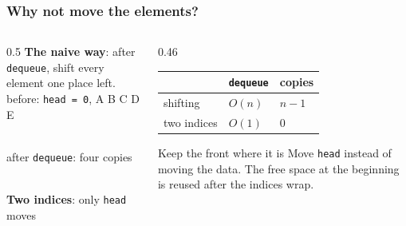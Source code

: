 \documentclass[aspectratio=169,10pt,compress]{beamer}
\begin{document}
\begin{frame}[t,fragile] \frametitle{Why not move the elements?}
  \begin{columns}[T]
    \begin{column}{0.5\textwidth}
      \small \textbf{The naive way}: after \texttt{dequeue}, shift every element one place left.\\[0.2em]
      before: \texttt{head = 0}, A B C D E\\
      \\[0.15em]
      after \texttt{dequeue}: four copies\\
      \\[0.15em]
      \textbf{Two indices}: only \texttt{head} moves\\
    \end{column}
    \begin{column}{0.46\textwidth}
      \begin{center}\small
      \begin{tabular}{lll}
        \toprule
        & \textbf{\texttt{dequeue}} & \textbf{copies} \\
        \midrule
        shifting      & $O(n)$ & $n-1$ \\
        two indices   & $O(1)$ & 0 \\
        \bottomrule
      \end{tabular}
      \end{center}
      \vspace{0.5em}
      \begin{block}{Keep the front where it is}
        \small Move \texttt{head} instead of moving the data.
        The free space at the beginning is reused after the indices wrap.
      \end{block}
    \end{column}
  \end{columns}
\end{frame}
\end{document}
